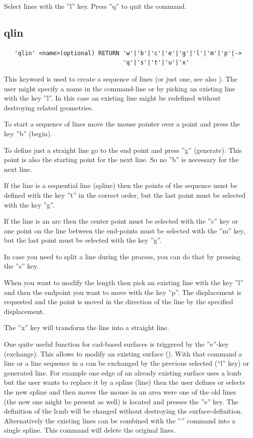 \documentclass{article}
\begin{document}
Select lines with the ''l'' key. Press ''q'' to quit the command.

\subsection{\label{qlin}qlin}
\begin{verbatim}
   'qlin' <name>(optional) RETURN 'w'|'b'|'c'|'e'|'g'|'l'|'m'|'p'|->
                                  'q'|'s'|'t'|'u'|'x'
\end{verbatim}
This keyword is used to create a sequence of lines (or just one, see also ). The user might specify a name in the command-line or by picking an existing line with the key ''l''. In this case an existing line might be redefined without destroying related geometries.

To start a sequence of lines move the mouse pointer over a point and press the key ''b'' (begin).

To define just a straight line go to the end point and press ''g'' (generate). This point is also the starting point for the next line. So no ''b'' is necessary for the next line.

If the line is a sequential line (spline) then the points of the sequence must be defined with the key ''t'' in the correct order, but the last point must be selected with the key ''g''.

If the line is an arc then the center point must be selected with the ''c'' key or one point on the line between the end-points must be selected with the ''m'' key, but the last point must be selected with the key ''g''.

In case you need to split a line during the process, you can do that by pressing the ''s'' key.

When you want to modify the length then pick an existing line with the key ''l'' and then the endpoint you want to move with the key ''p''. The displacement is requested and the point is moved in the direction of the line by the specified displacement. 

The ''x'' key will transform the line into a straight line.

One quite useful function for cad-based surfaces is triggered by the ''e''-key (exchange). This allows to modify an existing surface (). With that command a line or a line sequence in a  can be exchanged by the previous selected (``l'' key) or generated line. For example one edge of an already existing surface uses a lcmb but the user wants to replace it by a spline (line) then the user defines or selects the new spline and then moves the mouse in an area were one of the old lines (the new one might be present as well) is located and presses the ''e'' key. The definition of the lcmb will be changed without destroying the surface-definition. Alternatively the existing lines can be combined with the '''' command into a single spline. This command will delete the original lines.
\end{document}

